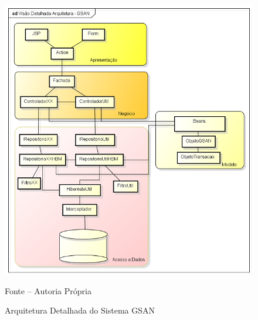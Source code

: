 \begin{figure}[H]
	\centering
	\includegraphics{figuras/gsanArquitetura.png}
	\caption{Arquitetura Detalhada do Sistema GSAN}	
	\label{figura:arquiteturaDetalhada}
	Fonte – Autoria Própria
\end{figure}


